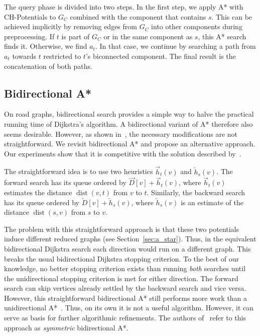 \documentclass[manuscript,review]{acmart}
\newcommand*{\dist}{\operatorname{dist}}
\begin{document}
The query phase is divided into two steps.
In the first step, we apply A* with CH-Potentials to $G_C$ combined with the component that contains $s$.
This can be achieved implicitly by removing edges from $G_C$ into other components during preprocessing.
If $t$ is part of $G_C$ or in the same component as $s$, this A* search finds it.
Otherwise, we find $a_t$.
In that case, we continue by searching a path from $a_t$ towards $t$ restricted to $t$'s biconnected component.
The final result is the concatenation of both paths.

\subsection{Bidirectional A*}\label{sec:bidir_astar}

On road graphs, bidirectional search provides a simple way to halve the practical running time of Dijkstra's algorithm.
A bidirectional variant of A* therefore also seems desirable.
However, as shown in~\cite{gh-cspas-05}, the necessary modifications are not straightforward.
We revisit bidirectional A* and propose an alternative approach.
Our experiments show that it is competitive with the solution described by~\cite{gh-cspas-05}.

The straightforward idea is to use two heuristics $\overrightarrow{h}_t(v)$ and $\overleftarrow{h}_s(v)$.
The forward search has its queue ordered by $\overrightarrow{D}[v] + \overrightarrow{h}_t(v)$, where $\overrightarrow{h}_t(v)$ estimates the distance $\dist(v,t)$ from $v$ to $t$.
Similarly, the backward search has its queue ordered by $\overleftarrow{D}[v] + \overleftarrow{h}_s(v)$, where $\overleftarrow{h}_s(v)$ is an estimate of the distance $\dist(s,v)$ from $s$ to $v$.

The problem with this straightforward approach is that these two potentials induce different reduced graphs (see Section~\ref{sec:a_star}).
Thus, in the equivalent bidirectional Dijkstra search each direction would run on a different graph.
This breaks the usual bidirectional Dijkstra stopping criterion.
To the best of our knowledge, no better stopping criterion exists than running \emph{both} searches until the unidirectional stopping criterion is met for either direction.
The forward search can skip vertices already settled by the backward search and vice versa.
However, this straightforward bidirectional A* still performs more work than a unidirectional A*~\cite{gh-cspas-05}.
Thus, on its own it is not a useful algorithm.
However, it can serve as basis for further algorithmic refinements.
The authors of~\cite{gh-cspas-05} refer to this approach as \emph{symmetric} bidirectional A*.
\end{document}
